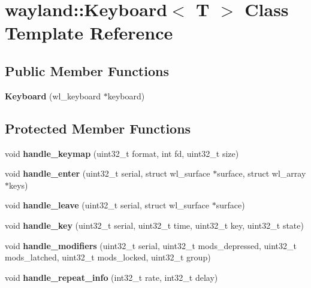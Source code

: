 \hypertarget{classwayland_1_1Keyboard}{}\section{wayland\+::Keyboard$<$ T $>$ Class Template Reference}
\label{classwayland_1_1Keyboard}
\subsection*{Public Member Functions}
\begin{DoxyCompactItemize}
\item 
\mbox{\label{classwayland_1_1Keyboard_a72ade70229d3229a72c13382cc74cd40}} 
{\bfseries Keyboard} (wl\+\_\+keyboard $\ast$keyboard)
\end{DoxyCompactItemize}
\subsection*{Protected Member Functions}
\begin{DoxyCompactItemize}
\item 
\mbox{\label{classwayland_1_1Keyboard_a5311683c74b178a3a7c2c4fc680060f0}} 
void {\bfseries handle\+\_\+keymap} (uint32\+\_\+t format, int fd, uint32\+\_\+t size)
\item 
\mbox{\label{classwayland_1_1Keyboard_a1cce92fa259fd996886c0f9ed258d49e}} 
void {\bfseries handle\+\_\+enter} (uint32\+\_\+t serial, struct wl\+\_\+surface $\ast$surface, struct wl\+\_\+array $\ast$keys)
\item 
\mbox{\label{classwayland_1_1Keyboard_a974d84b88b60dedff790da589a5652eb}} 
void {\bfseries handle\+\_\+leave} (uint32\+\_\+t serial, struct wl\+\_\+surface $\ast$surface)
\item 
\mbox{\label{classwayland_1_1Keyboard_ad21893bd390a7840a15c4aaa510331bf}} 
void {\bfseries handle\+\_\+key} (uint32\+\_\+t serial, uint32\+\_\+t time, uint32\+\_\+t key, uint32\+\_\+t state)
\item 
\mbox{\label{classwayland_1_1Keyboard_ae0ff5ad062208af9b94638a3c9fb75be}} 
void {\bfseries handle\+\_\+modifiers} (uint32\+\_\+t serial, uint32\+\_\+t mods\+\_\+depressed, uint32\+\_\+t mods\+\_\+latched, uint32\+\_\+t mods\+\_\+locked, uint32\+\_\+t group)
\item 
\mbox{\label{classwayland_1_1Keyboard_ae21f4ba447ca872e87b4bef34036033c}} 
void {\bfseries handle\+\_\+repeat\+\_\+info} (int32\+\_\+t rate, int32\+\_\+t delay)
\end{DoxyCompactItemize}
